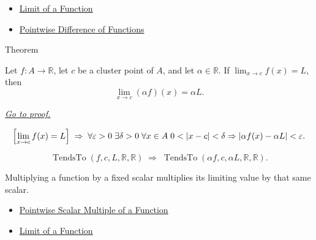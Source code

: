 \begin{dependencies}
\begin{itemize}
  \item \hyperref[def:limit-function]{Limit of a Function}
  \item \hyperref[def:pointwise-difference-of-functions]{Pointwise Difference of Functions}
\end{itemize}
\end{dependencies}


\begin{theorembox}{Theorem}
\begin{theorem}
\label{thm:limit-scalar-multiple}
Let $f:A\to\mathbb{R}$, let $c$ be a cluster point of $A$, and let
$\alpha\in\mathbb{R}$. If $\lim_{x\to c}f(x)=L$, then
\[
  \lim_{x\to c}(\alpha f)(x)=\alpha L.
\]

\smallskip\noindent
\hyperref[prf:limit-scalar-multiple]{\textit{Go to proof.}}
\end{theorem}
\end{theorembox}

\begin{remark*}
\[
  \Bigl[\lim_{x\to c}f(x)=L\Bigr]
  \;\Rightarrow\;
  \forall\varepsilon>0\;\exists\delta>0\;\forall x\in A\;
  0<|x-c|<\delta\Rightarrow |\alpha f(x)-\alpha L|<\varepsilon.
\]
\end{remark*}

\begin{remark*}
\[
  \operatorname{TendsTo}(f,c,L,\mathbb{R},\mathbb{R})
  \;\Longrightarrow\;
  \operatorname{TendsTo}(\alpha f,c,\alpha L,\mathbb{R},\mathbb{R}).
\]
\end{remark*}

\begin{remark*}[Interpretation]
Multiplying a function by a fixed scalar multiplies its limiting value by
that same scalar.
\end{remark*}

\begin{dependencies}
\begin{itemize}
  \item \hyperref[def:pointwise-scalar-multiple-of-a-function]{Pointwise Scalar Multiple of a Function}
  \item \hyperref[def:limit-function]{Limit of a Function}
\end{itemize}
\end{dependencies}

